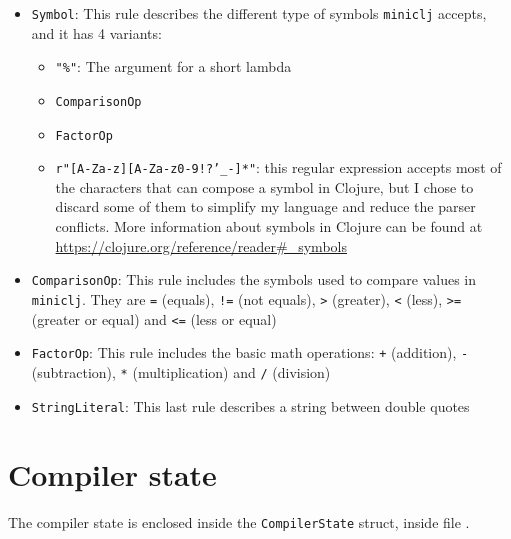 \documentclass[11pt]{scrreprt}
\begin{document}
\begin{itemize}
  \item \texttt{Symbol}: This rule describes the different type of symbols \texttt{miniclj} accepts, and it has 4 variants:
  \begin{itemize}
    \item \texttt{"\%"}: The argument for a short lambda
    \item \texttt{ComparisonOp}
    \item \texttt{FactorOp}
    \item \texttt{r"[A-Za-z][A-Za-z0-9!?'\_-]*"}: this regular expression accepts most of the characters that can compose a symbol in Clojure, but I chose to discard some of them to simplify my language and reduce the parser conflicts. More information about symbols in Clojure can be found at \url{https://clojure.org/reference/reader#_symbols}
  \end{itemize}
  \item \texttt{ComparisonOp}: This rule includes the symbols used to compare values in \texttt{miniclj}. They are \texttt{=} (equals), \texttt{!=} (not equals), \texttt{>} (greater), \texttt{<} (less), \texttt{>=} (greater or equal) and \texttt{<=} (less or equal)
  \item \texttt{FactorOp}: This rule includes the basic math operations: \texttt{+} (addition), \texttt{-} (subtraction), \texttt{*} (multiplication) and \texttt{/} (division)
  \item \texttt{StringLiteral}: This last rule describes a string between double quotes
\end{itemize}

\section{Compiler state}
The compiler state is enclosed inside the \texttt{CompilerState} struct, inside file .
\end{document}
